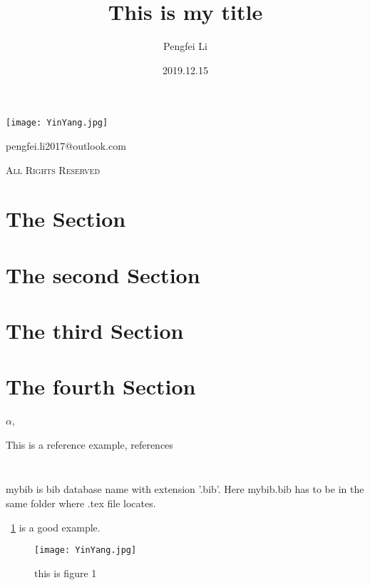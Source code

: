 \documentclass{article}
\title{This is my title}
\author{Pengfei Li}
\date{2019.12.15}
\begin{document}
\begin{titlepage}
\maketitle
{}
\centering
\vspace{10cm}
\texttt{[image: YinYang.jpg]}\par
\vspace{1cm}
{\huge pengfei.li2017@outlook.com}\par
\vspace{0.5cm}
\vspace{0.5cm}
{\scshape \small All Rights Reserved}
\end{titlepage}

\tableofcontents
{}%
\clearpage
\listoffigures
{}
\clearpage
\listoftables
{}
\clearpage

\newpage
{}
\section{The Section}

\newpage
\section{The second Section}

\newpage
\section{The third Section}

\newpage
\section{The fourth Section}

\(\alpha \),


 This is a reference example, references\cite{7398117}

\begin{lstlisting}[language = Python]
    
\end{lstlisting}
mybib is bib database name with extension \space'.bib'. Here mybib.bib has to be in the same folder where {.tex} file locates.





~\ref{fig1:figure1} is a good example.

\begin{figure}[htp]
    \centering
    \texttt{[image: YinYang.jpg]}
\label{fig1:figure1}
    \caption{this is figure 1}
\end{figure}
\end{document}
